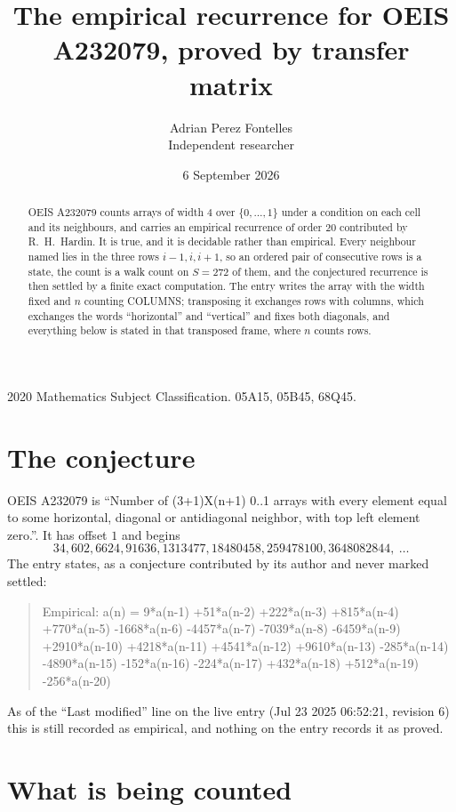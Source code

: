 \documentclass[11pt,a4paper]{article}
\title{The empirical recurrence for OEIS A232079, proved by transfer matrix}
\author{Adrian Perez Fontelles\\ \small Independent researcher}
\date{6 September 2026}
\theoremstyle{plain}
\theoremstyle{definition}
\begin{document}
\maketitle

\begin{abstract}
OEIS A232079 counts arrays of width $4$ over $\{0,\dots,1\}$ under a condition on each cell
and its neighbours, and carries an empirical recurrence of order $20$ contributed by
R.~H.~Hardin. It is true, and it is decidable rather than empirical. Every neighbour named lies
in the three rows $i-1,i,i+1$, so an ordered pair of consecutive rows is a state, the count is
a walk count on $S=272$ of them, and the conjectured recurrence is then settled by a finite
exact computation. The entry writes the array with the width fixed and $n$ counting
COLUMNS; transposing it exchanges rows with columns, which exchanges the words ``horizontal''
and ``vertical'' and fixes both diagonals, and everything below is stated in that transposed
frame, where $n$ counts rows.
\end{abstract}

\noindent\small 2020 Mathematics Subject Classification. 05A15, 05B45, 68Q45.\normalsize

\section{The conjecture}

OEIS A232079 is ``Number of (3+1)X(n+1) 0..1 arrays with every element equal to some horizontal, diagonal or antidiagonal neighbor, with top left element zero.''. It has offset $1$ and begins
\[
34, 602, 6624, 91636, 1313477, 18480458, 259478100, 3648082844,\ \dots
\]
The entry states, as a conjecture contributed by its author and never marked settled:
\begin{quote}
Empirical: a(n) = 9*a(n-1) +51*a(n-2) +222*a(n-3) +815*a(n-4) +770*a(n-5) -1668*a(n-6) -4457*a(n-7) -7039*a(n-8) -6459*a(n-9) +2910*a(n-10) +4218*a(n-11) +4541*a(n-12) +9610*a(n-13) -285*a(n-14) -4890*a(n-15) -152*a(n-16) -224*a(n-17) +432*a(n-18) +512*a(n-19) -256*a(n-20)
\end{quote}
As of the ``Last modified'' line on the live entry (Jul 23 2025 06:52:21, revision 6) this is still
recorded as empirical, and nothing on the entry records it as proved.

\section{What is being counted}
\end{document}
